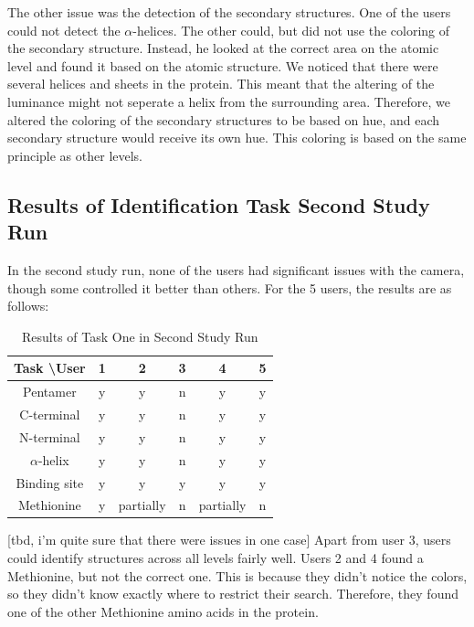 \documentclass[review,journal]{vgtc}         %
\begin{document}
	The other issue was the detection of the secondary structures. 
	One of the users could not detect the $\alpha$-helices. The other could, but did not use the coloring of the secondary structure.
	Instead, he looked at the correct area on the atomic level and found it based on the atomic structure.
	We noticed that there were several helices and sheets in the protein. 
	This meant that the altering of the luminance might not seperate a helix from the surrounding area. 
	Therefore, we altered the coloring of the secondary structures to be based on hue, and each secondary structure would receive its own hue.
	This coloring is based on the same principle as other levels.
	
	
	\subsection{Results of Identification Task Second Study Run}
	In the second study run, none of the users had significant issues with the camera, though some controlled it better than others.
	For the 5 users, the results are as follows:
	\begin{table}
		\caption{Results of Task One in Second Study Run}
		\centering
		\begin{tabular}{| c | c | c | c | c | c |}
			\hline
			Task \textbackslash User & 1 & 2 & 3 & 4 & 5 \\
			\hline
			Pentamer       & y & y & n & y & y\\
			\hline
			C-terminal     & y & y & n & y & y \\
			\hline
			N-terminal     & y & y & n & y & y  \\
			\hline
			$\alpha$-helix & y & y & n & y & y \\
			\hline
			Binding site   & y & y & y & y & y \\
			\hline
			Methionine      & y & partially & n & partially & n  \\
			\hline
		\end{tabular}
	\end{table}
	[tbd, i'm quite sure that there were issues in one case]
	Apart from user 3, users could identify structures across all levels fairly well. 
	Users 2 and 4 found a Methionine, but not the correct one. 
	This is because they didn't notice the colors, so they didn't know exactly where to restrict their search.
	Therefore, they found one of the other Methionine amino acids in the protein.
	
	
\end{document}
